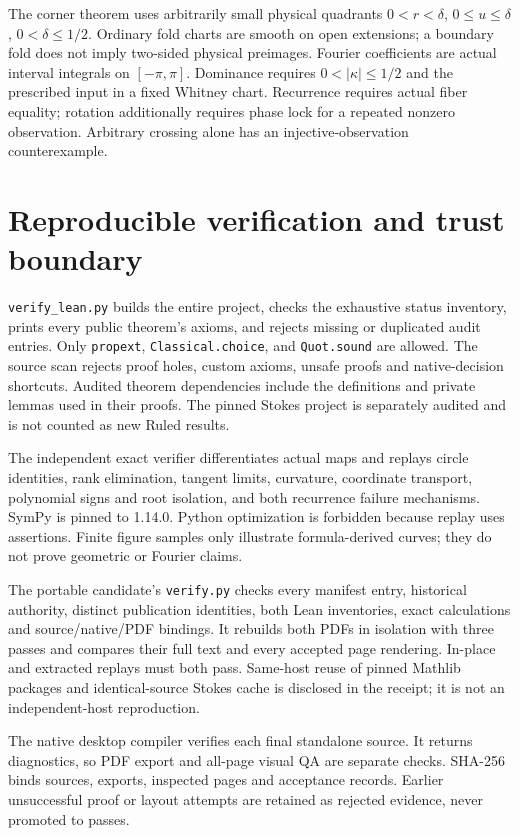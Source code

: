 \documentclass[11pt,a4paper]{article}
\begin{document}
The corner theorem uses arbitrarily small physical quadrants
$0<r<\delta$, $0\leq u\leq\delta$, $0<\delta\leq1/2$.
Ordinary fold charts are smooth on open extensions; a boundary fold does
not imply two-sided physical preimages. Fourier coefficients are actual
interval integrals on $[-\pi,\pi]$. Dominance requires
$0<|\kappa|\leq1/2$ and the prescribed input in a fixed Whitney chart.
Recurrence requires actual fiber equality; rotation additionally requires
phase lock for a repeated nonzero observation. Arbitrary crossing alone
has an injective-observation counterexample.

\section{Reproducible verification and trust boundary}
\texttt{verify\_lean.py} builds the entire project, checks the exhaustive
status inventory, prints every public theorem's axioms, and rejects missing
or duplicated audit entries. Only \texttt{propext}, \texttt{Classical.choice},
and \texttt{Quot.sound} are allowed. The source scan rejects proof holes,
custom axioms, unsafe proofs and native-decision shortcuts. Audited theorem
dependencies include the definitions and private lemmas used in their
proofs. The pinned Stokes project is separately audited and is not counted
as new Ruled results.

The independent exact verifier differentiates actual maps and replays
circle identities, rank elimination, tangent limits, curvature, coordinate
transport, polynomial signs and root isolation, and both recurrence failure
mechanisms. SymPy is pinned to 1.14.0. Python optimization is forbidden
because replay uses assertions. Finite figure samples only illustrate
formula-derived curves; they do not prove geometric or Fourier claims.

The portable candidate's \texttt{verify.py} checks every manifest entry,
historical authority, distinct publication identities, both Lean inventories,
exact calculations and source/native/PDF bindings. It rebuilds both PDFs in
isolation with three passes and compares their full text and every accepted
page rendering. In-place and extracted replays must both pass. Same-host
reuse of pinned Mathlib packages and identical-source Stokes cache is
disclosed in the receipt; it is not an independent-host reproduction.

The native desktop compiler verifies each final standalone source. It
returns diagnostics, so PDF export and all-page visual QA are separate
checks. SHA-256 binds sources, exports, inspected pages and acceptance
records. Earlier unsuccessful proof or layout attempts are retained as
rejected evidence, never promoted to passes.
\end{document}
